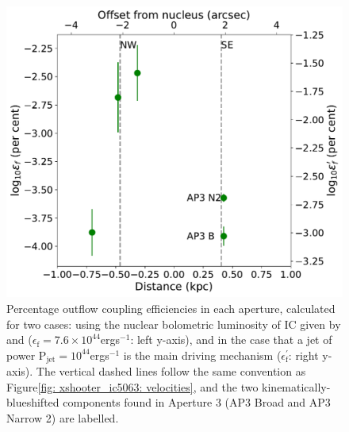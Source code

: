 \begin{figure}
	\centering
	\includegraphics[width=0.8\linewidth]{figures/xshooter_ic5063/fkin.pdf}
	\caption[Outflow coupling efficiencies for the Xshooter apertures of IC, calculated for two cases: using the AGN bolometric luminosity, and for a jet of power $P_\mathrm{jet}=10^{44}$\;erg\;s$^{-1}$]{Percentage outflow coupling efficiencies in each aperture, calculated for two cases: using the nuclear bolometric luminosity of IC given by \citet{Nicastro2003} and \citet{Morganti2007} ($\epsilon_\mathrm{f}=7.6\times 10^{44}$\;erg\;s$^{-1}$: left y-axis), and in the case that a jet of power P$_\mathrm{jet}=10^{44}$\;erg\;s$^{-1}$ \citep{Mukherjee2018} is the main driving mechanism ($\epsilon_\mathrm{f}^\prime$: right y-axis). The vertical dashed lines follow the same convention as Figure\;\ref{fig: xshooter_ic5063: velocities}, and the two kinematically-blueshifted components found in Aperture 3 (AP3 Broad and AP3 Narrow 2) are labelled.}
	\label{fig: xshooter_ic5063: fkin}
\end{figure}

